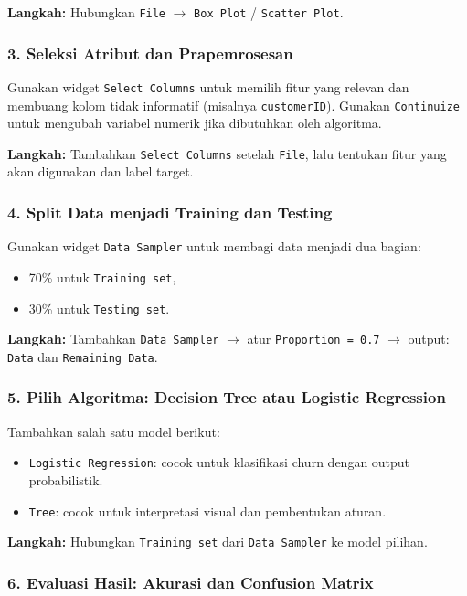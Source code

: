 \textbf{Langkah:} Hubungkan \texttt{File} $\rightarrow$ \texttt{Box Plot} / \texttt{Scatter Plot}.

\subsubsection*{3. Seleksi Atribut dan Prapemrosesan}

Gunakan widget \texttt{Select Columns} untuk memilih fitur yang relevan dan membuang kolom tidak informatif (misalnya \texttt{customerID}).  
Gunakan \texttt{Continuize} untuk mengubah variabel numerik jika dibutuhkan oleh algoritma.

\textbf{Langkah:} Tambahkan \texttt{Select Columns} setelah \texttt{File}, lalu tentukan fitur yang akan digunakan dan label target.

\subsubsection*{4. Split Data menjadi Training dan Testing}

Gunakan widget \texttt{Data Sampler} untuk membagi data menjadi dua bagian:
\begin{itemize}
	\item 70\% untuk \texttt{Training set},
	\item 30\% untuk \texttt{Testing set}.
\end{itemize}

\textbf{Langkah:} Tambahkan \texttt{Data Sampler} $\rightarrow$ atur \texttt{Proportion = 0.7} $\rightarrow$ output: \texttt{Data} dan \texttt{Remaining Data}.

\subsubsection*{5. Pilih Algoritma: Decision Tree atau Logistic Regression}

Tambahkan salah satu model berikut:
\begin{itemize}
	\item \texttt{Logistic Regression}: cocok untuk klasifikasi churn dengan output probabilistik.
	\item \texttt{Tree}: cocok untuk interpretasi visual dan pembentukan aturan.
\end{itemize}

\textbf{Langkah:} Hubungkan \texttt{Training set} dari \texttt{Data Sampler} ke model pilihan.

\subsubsection*{6. Evaluasi Hasil: Akurasi dan Confusion Matrix}

